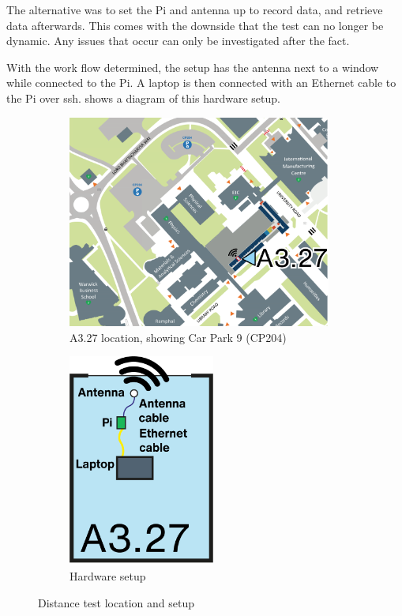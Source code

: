 The alternative was to set the Pi and antenna up to record data, and retrieve data afterwards.
This comes with the downside that the test can no longer be dynamic. Any issues that occur can
only be investigated after the fact.

With the work flow determined, the setup has the antenna next to a window while connected to the
Pi. A laptop is then connected with an Ethernet cable to the Pi over \acrshort{ssh}.
 shows a diagram of this hardware setup.

\begin{figure}[htbp]
    \centering
    \begin{subfigure}[b]{0.65\textwidth}
        \centering
        \includegraphics[height=7cm,width=\textwidth,keepaspectratio]{../figures/maps/room.png}
        \caption{A3.27 location, showing Car Park 9 (CP204)}
        \label{fig:roomlocation}
    \end{subfigure}
    \hfill
    \begin{subfigure}[b]{0.3\textwidth}
        \centering
        \includegraphics[height=7cm,width=\textwidth,keepaspectratio]{../figures/maps/setup.png}
        \caption{Hardware setup}
        \label{fig:disthardwaresetup}
    \end{subfigure}
    \caption{Distance test location and setup}
    \label{fig:distancesetup}
\end{figure}

